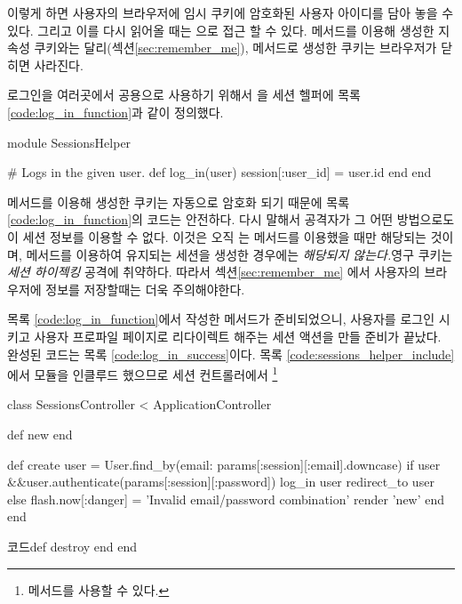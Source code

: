 \noindent 이렇게 하면 사용자의 브라우저에 임시 쿠키에 암호화된 사용자 아이디를 담아 놓을 수 있다. 그리고 이를 다시 읽어올 때는 으로 접근 할 수 있다.  메서드를 이용해 생성한 지속성 쿠키와는 달리(섹션\ref{sec:remember_me}),  메서드로 생성한 쿠키는 브라우저가 닫히면 사라진다. 

로그인을 여러곳에서 공용으로 사용하기 위해서 을 세션 헬퍼에 목록\ref{code:log_in_function}과 같이 정의했다. 

\begin{codelisting} \label{code:log_in_function}  

\begin{code} module SessionsHelper 

# Logs in the given user. def log_in(user) session[:user_id] = user.id end end \end{code} \end{codelisting} 

 메서드를 이용해 생성한 쿠키는 자동으로 암호화 되기 때문에 목록\ref{code:log_in_function}의 코드는 안전하다. 다시 말해서 공격자가 그 어떤 방법으로도 이 세션 정보를 이용할 수 없다. 이것은 오직 는 메서드를 이용했을 때만 해당되는 것이며,   메서드를 이용하여 유지되는 세션을 생성한 경우에는 \emph{해당되지 않는다.}영구 쿠키는 \emph{세션 하이젝킹} 공격에 취약하다. 따라서 섹션\ref{sec:remember_me} 에서 사용자의 브라우저에 정보를 저장할때는 더욱 주의해야한다. 

목록 \ref{code:log_in_function}에서 작성한  메서드가 준비되었으니, 사용자를 로그인 시키고 사용자 프로파일 페이지로 리다이렉트 해주는 세션 액션을 만들 준비가 끝났다. 완성된 코드는 목록 \ref{code:log_in_success}이다. 목록 \ref{code:sessions_helper_include}에서 모듈을 인클루드 했으므로 세션 컨트롤러에서 \footnote{  메서드를 사용할 수 있다.} 

\begin{codelisting} \label{code:log_in_success}  

\begin{code} class SessionsController < ApplicationController 

def new end 

def create user = User.find_by(email: params[:session][:email].downcase) if user &&user.authenticate(params[:session][:password]) log_in user redirect_to user else flash.now[:danger] = 'Invalid email/password combination' render 'new' end end 

코드def destroy end end \end{code} \end{codelisting} 

